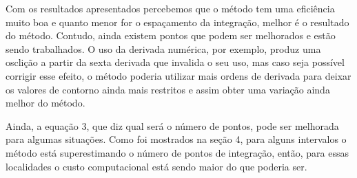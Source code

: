 \documentclass[12pt,a4paper]{article}
\begin{document}
\qquad Com os resultados apresentados percebemos que o método tem uma eficiência muito boa e quanto menor for o espaçamento da integração, melhor é o resultado do método. Contudo, ainda existem pontos que podem ser melhorados e estão sendo trabalhados. O uso da derivada numérica, por exemplo, produz uma osclição a partir da sexta derivada que invalida o seu uso, mas caso seja possível corrigir esse efeito, o método poderia utilizar mais ordens de derivada para deixar os valores de contorno ainda mais restritos e assim obter uma variação ainda melhor do método.

Ainda, a equação 3, que diz qual será o número de pontos, pode ser melhorada para algumas situações. Como foi mostrados na seção 4, para alguns intervalos o método está superestimando o número de pontos de integração, então, para essas localidades o custo computacional está sendo maior do que poderia ser.
\end{document}
